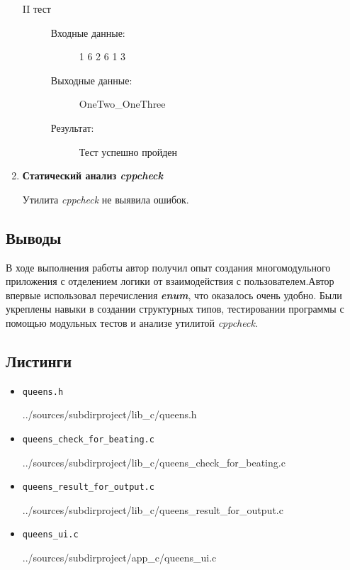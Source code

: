 \documentclass[12pt,a4paper]{report}
\begin{document}
\begin{enumerate}
\begin{description}
\item[II тест]
\hspace{\parindent}
\begin{flushleft}
\begin{description}
\item[Входные данные:] 1 6 2 6 1 3
\item[Выходные данные:] OneTwo\_OneThree
\item[Результат:] Тест успешно пройден
\end{description}
\end{flushleft}
\end{description}

\item \textbf{Статический анализ \textit{cppcheck}}

Утилита \textit{cppcheck} не выявила ошибок.
\end{enumerate}

\subsection{Выводы}
В ходе выполнения работы автор получил опыт создания многомодульного приложения с отделением логики от взаимодействия с пользователем.Автор впервые использовал перечисления \textit{\textbf{enum}}, что оказалось очень удобно. Были укреплены навыки в создании структурных типов, тестировании программы с помощью модульных тестов и анализе утилитой \textit{cppcheck}.
\subsection*{Листинги}
\begin{itemize}
\item[] \verb-queens.h-

{../sources/subdirproject/lib_c/queens.h}
\item[] \verb-queens_check_for_beating.c-

{../sources/subdirproject/lib_c/queens_check_for_beating.c}
\item[] \verb-queens_result_for_output.c-

{../sources/subdirproject/lib_c/queens_result_for_output.c}
\item[] \verb-queens_ui.c-

{../sources/subdirproject/app_c/queens_ui.c}
\end{itemize}
%
\end{document}
